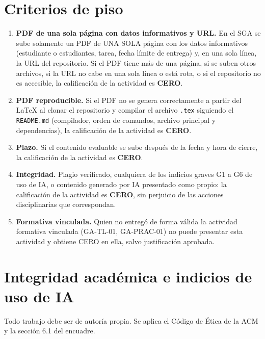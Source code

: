 \documentclass[11pt]{article}
\newcommand{\seccion}[1]{\section{\textcolor{utegreendk}{#1}}}
\begin{document}
\seccion{Criterios de piso}

\begin{cajapiso}[title={Criterios de piso: su incumplimiento implica calificación CERO en la actividad}]
	\begin{enumerate}[label=\textbf{P\arabic*.},leftmargin=24pt,itemsep=3pt]
		\item \textbf{PDF de una sola página con datos informativos y URL.} En el SGA se sube solamente un PDF de UNA SOLA página con los datos informativos (estudiante o estudiantes, tarea, fecha límite de entrega) y, en una sola línea, la URL del repositorio. Si el PDF tiene más de una página, si se suben otros archivos, si la URL no cabe en una sola línea o está rota, o si el repositorio no es accesible, la calificación de la actividad es \textbf{CERO}.
		\item \textbf{PDF reproducible.} Si el PDF no se genera correctamente a partir del \LaTeX{} al clonar el repositorio y compilar el archivo \texttt{.tex} siguiendo el \texttt{README.md} (compilador, orden de comandos, archivo principal y dependencias), la calificación de la actividad es \textbf{CERO}.
		\item \textbf{Plazo.} Si el contenido evaluable se sube después de la fecha y hora de cierre, la calificación de la actividad es \textbf{CERO}.
		\item \textbf{Integridad.} Plagio verificado, cualquiera de los indicios graves G1 a G6 de uso de IA, o contenido generado por IA presentado como propio: la calificación de la actividad es \textbf{CERO}, sin perjuicio de las acciones disciplinarias que correspondan.
		\item \textbf{Formativa vinculada.} Quien no entregó de forma válida la actividad formativa vinculada (GA-TL-01, GA-PRAC-01) no puede presentar esta actividad y obtiene CERO en ella, salvo justificación aprobada.
	\end{enumerate}
\end{cajapiso}

\seccion{Integridad académica e indicios de uso de IA}

Todo trabajo debe ser de autoría propia. Se aplica el Código de Ética de la ACM \citep{acm_code_2018} y la sección 6.1 del encuadre.
\end{document}
